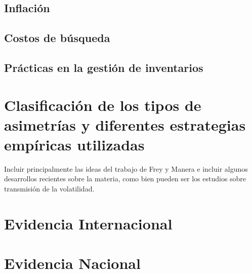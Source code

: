 \subsection{Inflación}
\subsection{Costos de búsqueda}
\subsection{Prácticas en la gestión de inventarios}

\section{Clasificación de los tipos de asimetrías y diferentes estrategias empíricas utilizadas}

Incluir principalmente las ideas del trabajo de Frey y Manera e incluir algunos desarrollos recientes sobre la materia, como bien pueden ser los estudios sobre transmisión de la volatilidad. 
\section{Evidencia Internacional}
\section{Evidencia Nacional}
